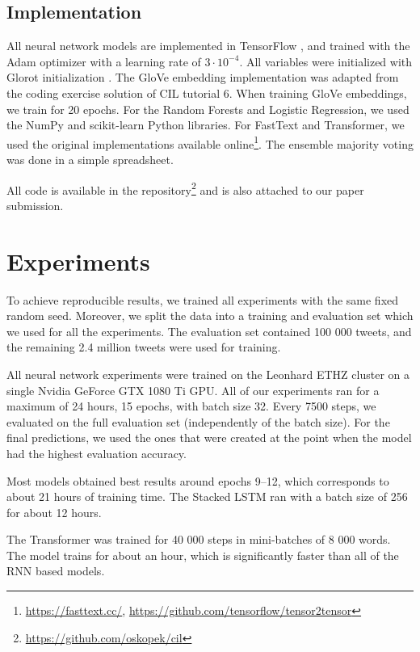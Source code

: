 \documentclass[10pt,conference,compsocconf]{IEEEtran}
\begin{document}
\subsection{Implementation}
All neural network models are implemented in TensorFlow \cite{tensorflow}, and trained with the Adam optimizer \cite{adam} with a learning rate of $3 \cdot 10^{-4}$. All variables were initialized with Glorot initialization \cite{glorot2010understanding}.
The GloVe embedding implementation was adapted from the coding exercise solution of CIL tutorial 6. When training GloVe embeddings, we train for 20 epochs. For the Random Forests and Logistic Regression, we used the NumPy \cite{numpy} and scikit-learn \cite{scikit-learn} Python libraries.
For FastText and Transformer, we used the original implementations available online\footnote{\url{https://fasttext.cc/}, \url{https://github.com/tensorflow/tensor2tensor}}.
The ensemble majority voting was done in a simple spreadsheet.

All code is available in the repository\footnote{\url{https://github.com/oskopek/cil}} and is also attached to our paper submission.


\section{Experiments}
To achieve reproducible results, we trained all experiments with the same fixed random seed. Moreover, we split the data into a training and evaluation set which we used for all the experiments.
The evaluation set contained 100 000 tweets, and the remaining 2.4 million tweets were used for training.

All neural network experiments were trained on the Leonhard ETHZ cluster on a single Nvidia GeForce GTX 1080 Ti GPU.
All of our experiments ran for a maximum of 24 hours, 15 epochs,
with batch size 32.
Every 7500 steps, we evaluated on the full evaluation set (independently of the batch size). For the final predictions, we used the ones that were created at the point when the model had the highest evaluation accuracy.

Most models obtained best results around epochs 9--12, which corresponds
to about 21 hours of training time.
The Stacked LSTM ran with a batch size of 256 for about 12 hours.

The Transformer was trained for 40 000 steps in mini-batches of 8 000 words. The model trains for about an hour, which is significantly faster than all of the RNN based models.
\end{document}
